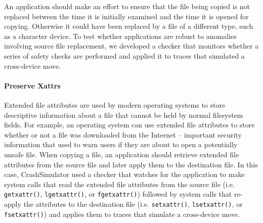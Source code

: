 An application should make an effort to ensure that the file being copied is not 
replaced between the time it is initially examined and the time it is opened 
for copying.  Otherwise it could have been replaced by a file of a different
type, such as a character device.
%
To test whether applications are robust to anomalies involving source file replacement,
we developed a checker that monitors whether a series of safety checks
are performed and applied it to traces that simulated a cross-device move.

\paragraph{Preserve Xattrs}

Extended file attributes are used by modern
operating systems to store descriptive information about a file that cannot be
held by normal filesystem fields.  For example, an operating system can use
extended file attributes to store whether or not a file was downloaded from the
Internet -- important security information that used to warn
users if they are about to open a potentially unsafe file.  
When copying a file,
an application should retrieve extended file attributes from the source
file and later apply them to the destination file.
In this case, CrashSimulator used a checker
that watches for the application to make system calls
that read the extended file attributes from the source file (i.e. {\tt
  getxattr()}, {\tt lgetxattr()}, or {\tt fgetxattr()}) followed by system calls
that re-apply the attributes to the destination file (i.e. {\tt setxattr()},
{\tt lsetxattr()}, or {\tt fsetxattr()}) and applies them
to traces that simulate a cross-device move.

